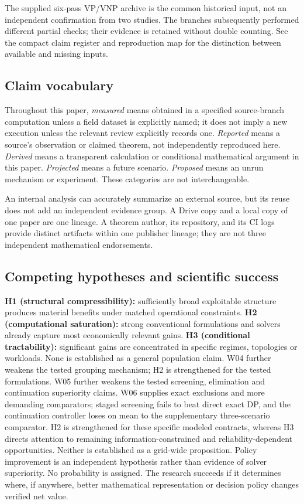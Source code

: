 \documentclass[11pt,letterpaper]{article}
\begin{document}
The supplied six-pass VP/VNP archive is the common historical input, not an independent confirmation from two studies. The branches subsequently performed different partial checks; their evidence is retained without double counting. See the compact claim register and reproduction map for the distinction between available and missing inputs.

\subsection{Claim vocabulary}
Throughout this paper, \emph{measured} means obtained in a specified source-branch computation unless a field dataset is explicitly named; it does not imply a new execution unless the relevant review explicitly records one. \emph{Reported} means a source's observation or claimed theorem, not independently reproduced here. \emph{Derived} means a transparent calculation or conditional mathematical argument in this paper. \emph{Projected} means a future scenario. \emph{Proposed} means an unrun mechanism or experiment. These categories are not interchangeable.

An internal analysis can accurately summarize an external source, but its reuse does not add an independent evidence group. A Drive copy and a local copy of one paper are one lineage. A theorem author, its repository, and its CI logs provide distinct artifacts within one publisher lineage; they are not three independent mathematical endorsements.

\subsection{Competing hypotheses and scientific success}
\textbf{H1 (structural compressibility):} sufficiently broad exploitable structure produces material benefits under matched operational constraints. \textbf{H2 (computational saturation):} strong conventional formulations and solvers already capture most economically relevant gains. \textbf{H3 (conditional tractability):} significant gains are concentrated in specific regimes, topologies or workloads. None is established as a general population claim. W04 further weakens the tested grouping mechanism; H2 is strengthened for the tested formulations. W05 further weakens the tested screening, elimination and continuation superiority claims. W06 supplies exact exclusions and more demanding comparators; staged screening fails to beat direct exact DP, and the continuation controller loses on mean to the supplementary three-scenario comparator. H2 is strengthened for these specific modeled contracts, whereas H3 directs attention to remaining information-constrained and reliability-dependent opportunities. Neither is established as a grid-wide proposition. Policy improvement is an independent hypothesis rather than evidence of solver superiority. No probability is assigned. The research succeeds if it determines where, if anywhere, better mathematical representation or decision policy changes verified net value.
\end{document}
